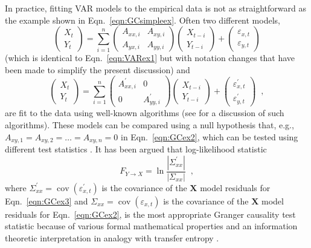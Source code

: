 \documentclass{article}[10pt]
\begin{document}
In practice, fitting VAR models to the empirical data is not as straightforward as the example shown in Eqn.\ \ref{eqn:GCsimpleex}.  Often two different models,
\begin{equation}
\label{eqn:GCex2}
\begin{pmatrix}
X_t \\ 
Y_t
\end{pmatrix} = \sum_{i=1}^n \begin{pmatrix}
A_{xx,i} & A_{xy,i}\\
A_{yx,i} & A_{yy,i}
\end{pmatrix}\begin{pmatrix}
X_{t-i} \\ 
Y_{t-i}
\end{pmatrix} + \begin{pmatrix}
\varepsilon_{x,t}\\
\varepsilon_{y,t}
\end{pmatrix}
\end{equation}
(which is identical to Eqn.\ \ref{eqn:VARex1} but with notation changes that have been made to simplify the present discussion) and
\begin{equation}
\label{eqn:GCex3}
\begin{pmatrix}
X_t \\ 
Y_t
\end{pmatrix} = \sum_{i=1}^n \begin{pmatrix}
A_{xx,i}^\prime & 0\\
0 & A_{yy,i}^\prime
\end{pmatrix}\begin{pmatrix}
X_{t-i} \\ 
Y_{t-i}
\end{pmatrix} + \begin{pmatrix}
\varepsilon_{x,t}^\prime\\
\varepsilon_{y,t}^\prime
\end{pmatrix}\;\;,
\end{equation}
are fit to the data using well-known algorithms (see \cite{Barnett2014} for a discussion of such algorithms).  These models can be compared using a null hypothesis that, e.g., $A_{xy,1}=A_{xy,2}=\ldots=A_{xy,n}=0$ in Eqn.\ \ref{eqn:GCex2}, which can be tested using different test statistics \cite{Barnett2014,Toda1994}.  It has been argued that log-likelihood statistic
\begin{equation}
F_{Y\rightarrow X} = \ln\frac{|\Sigma_{xx}^\prime|}{|\Sigma_{xx}|}\;\;,
\end{equation}
where $\Sigma_{xx}^\prime=\mathop{cov}(\varepsilon_{x,t}^\prime)$ is the covariance of the $\mathbf{X}$ model residuals for Eqn.\ \ref{eqn:GCex3} and $\Sigma_{xx}=\mathop{cov}(\varepsilon_{x,t})$ is the covariance of the $\mathbf{X}$ model residuals for Eqn.\ \ref{eqn:GCex2}, is the most appropriate Granger causality test statistic because of various formal mathematical properties and an information theoretic interpretation in analogy with transfer entropy \cite{Barnett2014,Barnett2009}.
\end{document}
